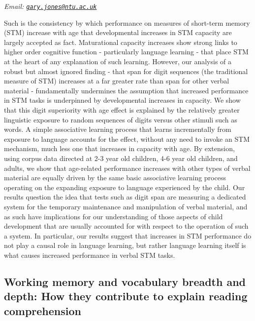 \documentclass[12pt,]{book}
\begin{document}
\emph{Email: \href{mailto:gary.jones@ntu.ac.uk}{\nolinkurl{gary.jones@ntu.ac.uk}}}

Such is the consistency by which performance on measures of short-term memory (STM) increase with age that developmental increases in STM capacity are largely accepted as fact. Maturational capacity increases show strong links to higher order cognitive function - particularly language learning - that place STM at the heart of any explanation of such learning. However, our analysis of a robust but almost ignored finding - that span for digit sequences (the traditional measure of STM) increases at a far greater rate than span for other verbal material - fundamentally undermines the assumption that increased performance in STM tasks is underpinned by developmental increases in capacity. We show that this digit superiority with age effect is explained by the relatively greater linguistic exposure to random sequences of digits versus other stimuli such as words. A simple associative learning process that learns incrementally from exposure to language accounts for the effect, without any need to invoke an STM mechanism, much less one that increases in capacity with age. By extension, using corpus data directed at 2-3 year old children, 4-6 year old children, and adults, we show that age-related performance increases with other types of verbal material are equally driven by the same basic associative learning process operating on the expanding exposure to language experienced by the child. Our results question the idea that tests such as digit span are measuring a dedicated system for the temporary maintenance and manipulation of verbal material, and as such have implications for our understanding of those aspects of child development that are usually accounted for with respect to the operation of such a system. In particular, our results suggest that increases in STM performance do not play a causal role in language learning, but rather language learning itself is what causes increased performance in verbal STM tasks.

\hypertarget{working-memory-and-vocabulary-breadth-and-depth-how-they-contribute-to-explain-reading-comprehension}{%
\subsection{Working memory and vocabulary breadth and depth: How they contribute to explain reading comprehension}\label{working-memory-and-vocabulary-breadth-and-depth-how-they-contribute-to-explain-reading-comprehension}}
\end{document}

